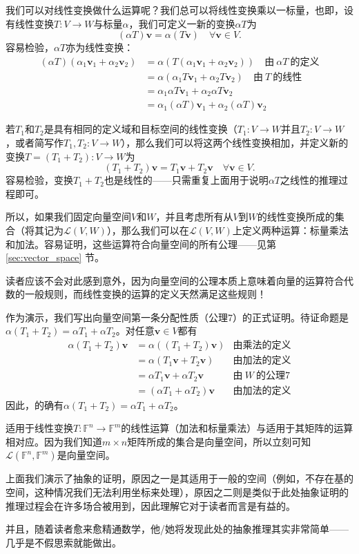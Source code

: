 我们可以对线性变换做什么运算呢？我们总可以将线性变换乘以一标量，也即，设有线性变换$T:V\to W$与标量$\alpha$，我们可定义一新的变换$\alpha T$为
\[(\alpha T)\mathbf{v}=\alpha(T\mathbf{v})\quad\forall\mathbf{v}\in V.\]
容易检验，$\alpha T$亦为线性变换：
\[\begin{aligned}
    (\alpha T)(\alpha_{1}\mathbf{v}_{1}+\alpha_{2}\mathbf{v}_{2})&=\alpha(T(\alpha_{1}\mathbf{v}_{1}+\alpha_{2}\mathbf{v}_{2}))\quad\text{由}~\alpha T~\text{的定义}\\
    &=\alpha(\alpha_{1}T\mathbf{v}_{1}+\alpha_{2}T\mathbf{v}_{2})\quad\text{由}~ T~\text{的线性}\\
    &=\alpha_{1}\alpha T\mathbf{v}_{1}+\alpha_{2}\alpha T\mathbf{v}_{2}\\
    &=\alpha_{1}(\alpha T)\mathbf{v}_{1}+\alpha_{2}(\alpha T)\mathbf{v}_{2}
\end{aligned}\]

若$T_1$和$T_2$是具有相同的定义域和目标空间的线性变换（$T_{1}:V\to W$并且$T_{2}:V\to W$，或者简写作$T_{1},T_{2}:V\to W$），那么我们可以将这两个线性变换相加，并定义新的变换$T=(T_1+T_2):V\to W$为
\[(T_1+T_2)\mathbf{v}=T_1\mathbf{v}+T_2\mathbf{v}\quad\forall\mathbf{v}\in V.\]
容易检验，变换$T_1+T_2$也是线性的——只需重复上面用于说明$\alpha T$之线性的推理过程即可。

所以，如果我们固定向量空间$V$和$W$，并且考虑所有从$V$到$W$的线性变换所成的集合（将其记为$\mathcal{L}(V,W)$），那么我们可以在$\mathcal{L}(V,W)$上定义两种运算：标量乘法和加法。容易证明，这些运算符合向量空间的所有公理——见第 \ref{sec:vector_space} 节。

读者应该不会对此感到意外，因为向量空间的公理本质上意味着向量的运算符合代数的一般规则，而线性变换的运算的定义天然满足这些规则！

作为演示，我们写出向量空间第一条分配性质（公理7）的正式证明。待证命题是$\alpha(T_{1}+T_{2})=\alpha T_{1}+\alpha T_{2}$。对任意$\mathbf{v}\in V$都有
\[\begin{aligned}
    \alpha(T_{1}+T_{2})\mathbf{v}&=\alpha((T_{1}+T_{2})\mathbf{v})&\text{由乘法的定义}\\
    &=\alpha(T_1\mathbf{v}+T_2\mathbf{v})&\text{由加法的定义}\\
    &=\alpha T_{1}\mathbf{v}+\alpha T_{2}\mathbf{v}&\text{由}~W~\text{的公理7}\\
    &=(\alpha T_{1}+\alpha T_{2})\mathbf{v}&\text{由加法的定义}
\end{aligned}\]
因此，的确有$\alpha(T_{1}+T_{2})=\alpha T_{1}+\alpha T_{2}$。

\begin{remark*}
    适用于线性变换$T:\mathbb{F}^n\to \mathbb{F}^m$的线性运算（加法和标量乘法）与适用于其矩阵的运算相对应。因为我们知道$m\times n$矩阵所成的集合是向量空间，所以立刻可知$\mathcal{L}(\mathbb{F}^n, \mathbb{F}^m)$是向量空间。

    上面我们演示了抽象的证明，原因之一是其适用于一般的空间（例如，不存在基的空间，这种情况我们无法利用坐标来处理），原因之二则是类似于此处抽象证明的推理过程会在许多场合被用到，因此理解它对于读者而言是有益的。

    并且，随着读者愈来愈精通数学，他/她将发现此处的抽象推理其实非常简单——几乎是不假思索就能做出。
\end{remark*}

